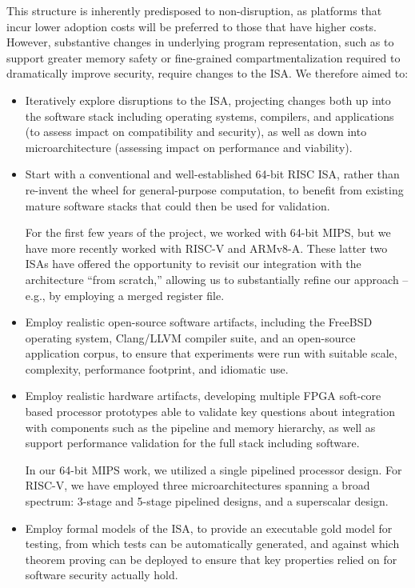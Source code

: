 This structure is inherently predisposed to non-disruption, as platforms that
incur lower adoption costs will be preferred to those that have higher costs.
However, substantive changes in underlying program representation, such as to
support greater memory safety or fine-grained compartmentalization required to
dramatically improve security, require changes to the ISA.
We therefore aimed to:

\begin{itemize}
\item Iteratively explore disruptions to the ISA, projecting changes both up
  into the software stack including operating systems, compilers, and
  applications (to assess impact on compatibility and security), as well as
  down into microarchitecture (assessing impact on performance and viability).

\item Start with a conventional and well-established 64-bit RISC ISA, rather
  than re-invent the wheel for general-purpose computation, to benefit from
  existing mature software stacks that could then be used for validation.

  For the first few years of the project, we worked with 64-bit MIPS, but we
  have more recently worked with RISC-V and ARMv8-A.
  These latter two ISAs have offered the opportunity to revisit our
  integration with the architecture ``from scratch,'' allowing us to
  substantially refine our approach -- e.g., by employing a merged register
  file.

\item Employ realistic open-source software artifacts, including the FreeBSD
  operating system, Clang/LLVM compiler suite, and an open-source application
  corpus, to ensure that experiments were run with suitable scale, complexity,
  performance footprint, and idiomatic use.

\item Employ realistic hardware artifacts, developing multiple FPGA
  soft-core based processor prototypes able to validate key questions about
  integration with components such as the pipeline and memory hierarchy, as
  well as support performance validation for the full stack including
  software.

  In our 64-bit MIPS work, we utilized a single pipelined processor design.
  For RISC-V, we have employed three microarchitectures spanning a broad
  spectrum: 3-stage and 5-stage pipelined designs, and a superscalar design.

\item Employ formal models of the ISA, to provide an executable gold model for
  testing, from which tests can be automatically generated, and against which
  theorem proving can be deployed to ensure that key properties relied on for
  software security actually hold.


\end{itemize}
